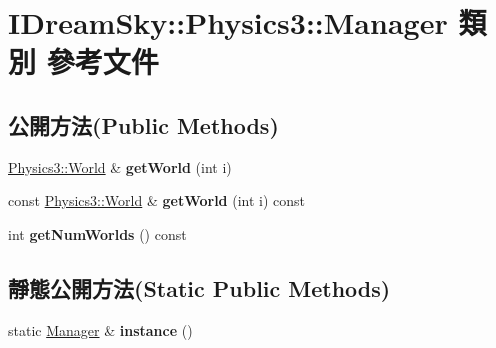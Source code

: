 \hypertarget{class_i_dream_sky_1_1_physics3_1_1_manager}{}\section{I\+Dream\+Sky\+:\+:Physics3\+:\+:Manager 類別 參考文件}
\label{class_i_dream_sky_1_1_physics3_1_1_manager}
\subsection*{公開方法(Public Methods)}
\begin{DoxyCompactItemize}
\item 
\hyperlink{class_i_dream_sky_1_1_physics3_1_1_world}{Physics3\+::\+World} \& {\bfseries get\+World} (int i)\hypertarget{class_i_dream_sky_1_1_physics3_1_1_manager_aa7fdbb792e414bb9d6ac35468227959c}{}\label{class_i_dream_sky_1_1_physics3_1_1_manager_aa7fdbb792e414bb9d6ac35468227959c}

\item 
const \hyperlink{class_i_dream_sky_1_1_physics3_1_1_world}{Physics3\+::\+World} \& {\bfseries get\+World} (int i) const \hypertarget{class_i_dream_sky_1_1_physics3_1_1_manager_a55881883e75a39ebff5ca24fb130d90e}{}\label{class_i_dream_sky_1_1_physics3_1_1_manager_a55881883e75a39ebff5ca24fb130d90e}

\item 
int {\bfseries get\+Num\+Worlds} () const \hypertarget{class_i_dream_sky_1_1_physics3_1_1_manager_a0b803cca950cb5ae6b3b9b98b3598076}{}\label{class_i_dream_sky_1_1_physics3_1_1_manager_a0b803cca950cb5ae6b3b9b98b3598076}

\end{DoxyCompactItemize}
\subsection*{靜態公開方法(Static Public Methods)}
\begin{DoxyCompactItemize}
\item 
static \hyperlink{class_i_dream_sky_1_1_physics3_1_1_manager}{Manager} \& {\bfseries instance} ()\hypertarget{class_i_dream_sky_1_1_physics3_1_1_manager_a48403031a7ba5fa0b39029318e09ee9c}{}\label{class_i_dream_sky_1_1_physics3_1_1_manager_a48403031a7ba5fa0b39029318e09ee9c}

\end{DoxyCompactItemize}
